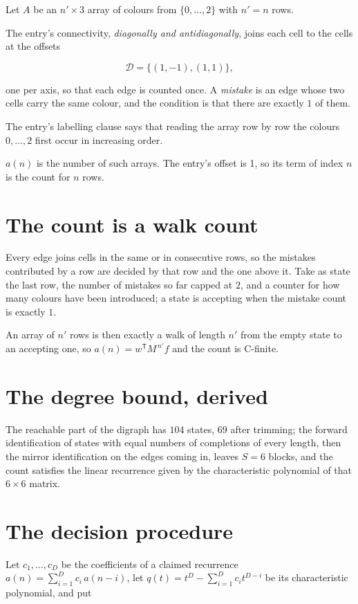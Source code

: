\documentclass[11pt]{article}
\theoremstyle{definition}
\begin{document}
Let $A$ be an $n' \times 3$ array of colours from $\{0,\dots,2\}$ with $n' = n$ rows.

The entry's connectivity, {\itshape diagonally and antidiagonally}, joins each cell to the cells at the offsets

\[\mathcal{D} = \{(1,-1), (1,1)\},\]

one per axis, so that each edge is counted once. A {\itshape mistake} is an edge whose two cells carry the same colour, and the condition is that there are exactly $1$ of them.

The entry's labelling clause says that reading the array row by row the colours $0,\dots,2$ first occur in increasing order.

$a(n)$ is the number of such arrays. The entry's offset is 1, so its term of index $n$ is the count for $n$ rows.

\section{The count is a walk count}

Every edge joins cells in the same or in consecutive rows, so the mistakes contributed by a row are decided by that row and the one above it. Take as state the last row, the number of mistakes so far capped at $2$, and a counter for how many colours have been introduced; a state is accepting when the mistake count is exactly $1$.

An array of $n'$ rows is then exactly a walk of length $n'$ from the empty state to an accepting one, so $a(n) = w^{\mathsf T}M^{\,n'}f$ and the count is C-finite.

\section{The degree bound, derived}

The reachable part of the digraph has $104$ states, $69$ after trimming; the forward identification of states with equal numbers of completions of every length, then the mirror identification on the edges coming in, leaves $S = 6$ blocks, and the count satisfies the linear recurrence given by the characteristic polynomial of that $6\times6$ matrix.

\section{The decision procedure}

Let $c_1,\dots,c_D$ be the coefficients of a claimed recurrence $a(n) = \sum_{i=1}^{D} c_i\,a(n-i)$, let $q(t) = t^{D} - \sum_{i=1}^{D} c_i t^{D-i}$ be its characteristic polynomial, and put
\end{document}
